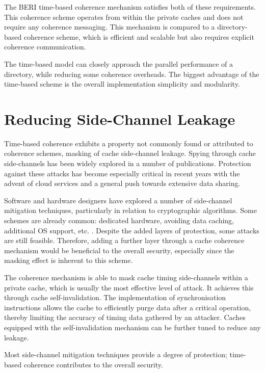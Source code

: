 		The BERI time-based coherence mechanism satisfies both of these requirements. This coherence scheme operates from within the private caches and does not require any coherence messaging. This mechanism is compared to a directory-based coherence scheme, which is efficient and scalable but also requires explicit coherence communication.
		
		The time-based model can closely approach the parallel performance of a directory, while reducing some coherence overheads. The biggest advantage of the time-based scheme is the overall implementation simplicity and modularity.

\vspace{5mm}
	\section{Reducing Side-Channel Leakage}
		Time-based coherence exhibits a property not commonly found or attributed to coherence schemes, masking of cache side-channel leakage. Spying through cache side-channels has been widely explored in a number of publications. Protection against these attacks has become especially critical in recent years with the advent of cloud services and a general push towards extensive data sharing. 
		
		Software and hardware designers have explored a number of side-channel mitigation techniques, particularly in relation to cryptographic algorithms. Some schemes are already common: dedicated hardware, avoiding data caching, additional OS support, etc. \cite{Osvik06,Tromer10}. 
		Despite the added layers of protection, some attacks are still feasible. Therefore, adding a further layer through a cache coherence mechanism would be beneficial to the overall security, especially since the masking effect is inherent to this scheme. 
		
		The coherence mechanism is able to mask cache timing side-channels within a private cache, which is usually the most effective level of attack. It achieves this through cache self-invalidation. The implementation of synchronisation instructions allows the cache to efficiently purge data after a critical operation, thereby limiting the accuracy of timing data gathered by an attacker.
		Caches equipped with the self-invalidation mechanism can be further tuned to reduce any leakage.
		
		Most side-channel mitigation techniques provide a degree of protection; time-based coherence contributes to the overall security.


